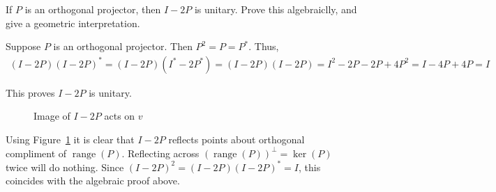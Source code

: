 \documentclass[10pt]{article}
\begin{document}
\maketitle

\begin{problem}[Exercise 6.1]
If \( P \) is an orthogonal projector, then \( I-2P \) is unitary. Prove this algebraiclly, and give a geometric interpretation.
\end{problem}

\begin{solution}[Solution]

Suppose \( P \) is an orthogonal projector. Then \( P^2=P = P^* \). Thus,
\begin{align*}
	(I-2P)(I-2P)^* = (I-2P)(I^*-2P^*) = (I-2P)(I-2P) = I^2-2P-2P+4P^2 = I-4P+4P = I
\end{align*}

This proves \( I-2P \) is unitary.

\begin{figure}[H]\centering
    \caption{Image of \( I-2P \) acts on \( v \)}
    \label{proj}
\end{figure}

Using Figure~\ref{proj} it is clear that \( I-2P \) reflects points about orthogonal compliment of \( \operatorname{range}(P) \). Reflecting across \( (\operatorname{range}(P))^\perp = \operatorname{ker}(P) \) twice will do nothing. Since \( (I-2P)^2=(I-2P)(I-2P)^* = I \), this coincides with the algebraic proof above.
\end{solution}
\end{document}
